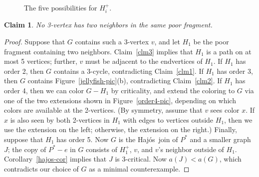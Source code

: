 \documentclass[12pt]{article}
\theoremstyle{plain}
\newtheorem{clm}{Claim}
\theoremstyle{definition}
\theoremstyle{remark}
\def\hajos{Haj\'{o}s}
\begin{document}
\begin{figure}
{{
}}
\caption{The five possibilities for $H_i^+$.\label{fig:H_i^+}
}
\end{figure}

\begin{clm}
No 3-vertex has two neighbors in the same poor fragment.
\label{clm4}
\end{clm}
\begin{proof}
Suppose that $G$ contains such a 3-vertex $v$, and let $H_1$ be the poor
fragment containing two neighbors.  Claim~\ref{clm3} implies that
$H_1$ is a path on at most 5 vertices; further, $v$ must be adjacent
to the endvertices of $H_1$.  
If $H_1$ has order 2, then $G$ contains a 3-cycle, contradicting Claim~\ref{clm1}.
If $H_1$ has order 3, then $G$ contains Figure~\ref{jellyfish-pic}(b),
contradicting Claim~\ref{clm2}.
If $H_1$ has order 4, then we can color $G-H_1$ by criticality, and extend
the coloring to $G$
via one of the two extensions shown in Figure~\ref{order4-pic}, depending on
which colors are available at the 2-vertices. 
(By symmetry, assume that $v$ sees color $x$.  If $x$ is also seen by both
2-vertices in $H_1$ with edges to vertices outside $H_1$, then we use the
extension on the left; otherwise, the extension on the right.)
Finally, suppose that $H_1$ has order 5.  Now $G$ is the \hajos\ join of
$P^*$ and a smaller graph $J$; the copy of $P^*-e$ in $G$ consists
of $H_1^+$, $v$, and $v$'s neighbor outside of $H_1$.  
Corollary~\ref{hajos-cor} implies that $J$ is 3-critical.  Now $a(J)<a(G)$,
which contradicts our choice of $G$ as a minimal counterexample.
\end{proof}
\end{document}
